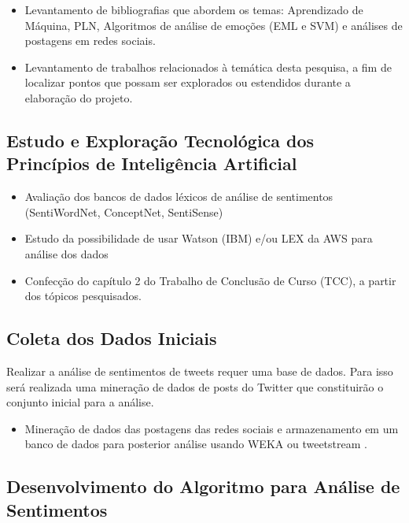 \documentclass[
	12pt,				%
	openright,			%
	oneside,			%
	a4paper,			%
	english,			%
	spanish,			%
	brazil				%
	]{abntex2}
\begin{document}
				\begin{itemize}

					\item Levantamento de bibliografias que abordem os temas: Aprendizado de Máquina, \gls{PLN}, Algoritmos de análise de emoções (\gls{EML} e \gls{SVM}) e análises de postagens em redes sociais.
					\item Levantamento de trabalhos relacionados à temática desta pesquisa, a fim de localizar pontos que possam ser explorados ou estendidos durante a elaboração do projeto.
					
				\end{itemize}
				
		\subsection*{Estudo e Exploração Tecnológica dos Princípios de Inteligência Artificial }
				
				\begin{itemize} 
					\item Avaliação dos bancos de dados léxicos de análise de sentimentos (SentiWordNet, ConceptNet, SentiSense)
					\item Estudo da possibilidade de usar Watson (IBM) e/ou LEX da \gls{AWS} para análise dos dados
					\item Confecção do capítulo 2 do Trabalho de Conclusão de Curso (TCC), a partir dos tópicos pesquisados.
				\end{itemize}			
				
		\subsection*{Coleta dos Dados Iniciais}
		Realizar a análise de sentimentos de tweets requer uma base de dados. Para isso será realizada uma mineração de dados de posts do Twitter que constituirão o conjunto inicial para a análise.
		 
				\begin{itemize}
					\item Mineração de dados das postagens das redes sociais e armazenamento em um banco de dados para posterior análise usando WEKA \cite{article_weka} ou tweetstream \cite{tweetstream}.
				\end{itemize}
				
		\subsection*{Desenvolvimento do Algoritmo para Análise de Sentimentos}				
\end{document}

